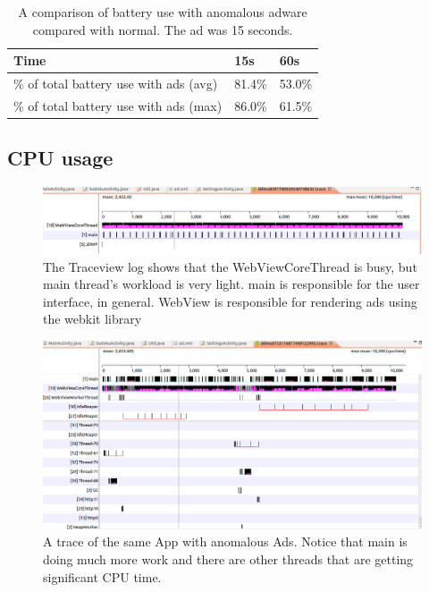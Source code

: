 \begin{table}%
\centering 
\scriptsize
\caption{A comparison of battery use with anomalous adware compared with normal.
The ad was 15 seconds.}
\label{table:battery}
\begin{tabular}{|l||l|l|}
    \hline
    {\bf Time} & {\bf 15s} & {\bf 60s}  \\
    \hline
    \% of total battery use with ads (avg)  & 81.4\%   & 53.0\%    \\
    \hline
    \% of total battery use with ads (max) & 86.0\%  & 61.5\%   \\
    \hline 
\end{tabular}

\end{table}

\subsection{CPU usage}

\begin{figure}[ht]
\centering
\includegraphics[width=6.5in]{no_AdsDisplay_10s.png}
\caption{The Traceview log shows that the
WebViewCoreThread is busy, but main thread's workload is very light.  main is responsible for 
the user interface, in general.  WebView is responsible for rendering ads using the webkit library}
\label{fig:cpu-no-ad}
\end{figure}

\begin{figure}[ht]
\centering
\includegraphics[width=6.5in]{traceview.png}
\caption{A trace of the same App with anomalous Ads.  Notice that main is doing much more work and
there are other threads that are getting significant CPU time.}
\label{fig:cpu-ad}
\end{figure}

